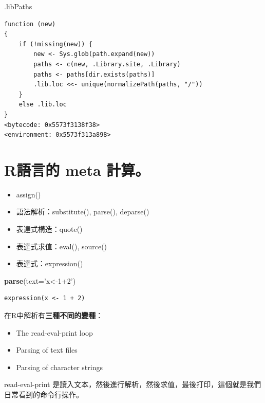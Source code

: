 \documentclass[]{book}
\newenvironment{Shaded}{\begin{snugshade}}{\end{snugshade}}
\newcommand{\DataTypeTok}[1]{\textcolor[rgb]{0.13,0.29,0.53}{#1}}
\newcommand{\KeywordTok}[1]{\textcolor[rgb]{0.13,0.29,0.53}{\textbf{#1}}}
\newcommand{\NormalTok}[1]{#1}
\newcommand{\StringTok}[1]{\textcolor[rgb]{0.31,0.60,0.02}{#1}}
\providecommand{\tightlist}{%
  \setlength{\itemsep}{0pt}\setlength{\parskip}{0pt}}
\theoremstyle{definition}
\theoremstyle{definition}
\theoremstyle{definition}
\theoremstyle{remark}
\begin{document}
\begin{Shaded}
\begin{Highlighting}[]
\NormalTok{.libPaths}
\end{Highlighting}
\end{Shaded}

\begin{verbatim}
function (new) 
{
    if (!missing(new)) {
        new <- Sys.glob(path.expand(new))
        paths <- c(new, .Library.site, .Library)
        paths <- paths[dir.exists(paths)]
        .lib.loc <<- unique(normalizePath(paths, "/"))
    }
    else .lib.loc
}
<bytecode: 0x5573f3138f38>
<environment: 0x5573f313a898>
\end{verbatim}

\hypertarget{r-meta-}{%
\section{R語言的 meta 計算。}\label{r-meta-}}

\begin{itemize}
\tightlist
\item
  assign()
\item
  語法解析：substitute(), parse(), deparse()\\
\item
  表達式構造：quote()
\item
  表達式求值：eval(), source()
\item
  表達式：expression()
\end{itemize}

\begin{Shaded}
\begin{Highlighting}[]
\KeywordTok{parse}\NormalTok{(}\DataTypeTok{text=}\StringTok{'x<-1+2'}\NormalTok{)}
\end{Highlighting}
\end{Shaded}

\begin{verbatim}
expression(x <- 1 + 2)
\end{verbatim}

在R中解析有\textbf{三種不同的變種}：

\begin{itemize}
\tightlist
\item
  The read-eval-print loop
\item
  Parsing of text files
\item
  Parsing of character strings
\end{itemize}

read-eval-print
是讀入文本，然後進行解析，然後求值，最後打印，這個就是我們日常看到的命令行操作。
\end{document}
